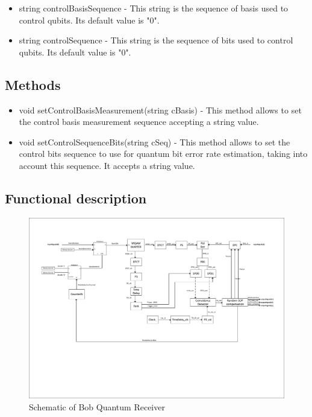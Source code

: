 	\begin{itemize}
        \item string controlBasisSequence - This string is the sequence of basis used to control qubits. Its default value is "0".

        \item string controlSequence - This string is the sequence of bits used to control qubits. Its default value is "0".

	\end{itemize}

\subsection*{Methods}
\begin{itemize}
        \item void setControlBasisMeasurement(string cBasis) - This method allows to set the control basis measurement sequence accepting a string value.

        \item void setControlSequenceBits(string cSeq) - This method allows to set the control bits sequence to use for quantum bit error rate estimation, taking into account this sequence. It accepts a string value.

\end{itemize}

\subsection*{Functional description}

\begin{figure}[h]
	\centering
	\includegraphics[clip, trim=0.5cm 6.0cm 0.5cm 2cm, width=1.0\textwidth]{./lib/BobQuantumRx/figures/BobQRx_diagram.pdf}
	\caption{Schematic of Bob Quantum Receiver}\label{bobQuantumRxDiagram}
\end{figure}

